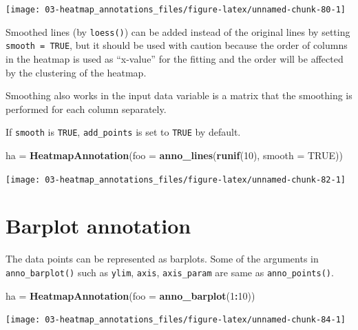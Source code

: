 \documentclass[]{book}
\newenvironment{Shaded}{\begin{snugshade}}{\end{snugshade}}
\newcommand{\KeywordTok}[1]{\textcolor[rgb]{0.13,0.29,0.53}{\textbf{#1}}}
\newcommand{\DataTypeTok}[1]{\textcolor[rgb]{0.13,0.29,0.53}{#1}}
\newcommand{\DecValTok}[1]{\textcolor[rgb]{0.00,0.00,0.81}{#1}}
\newcommand{\StringTok}[1]{\textcolor[rgb]{0.31,0.60,0.02}{#1}}
\newcommand{\OtherTok}[1]{\textcolor[rgb]{0.56,0.35,0.01}{#1}}
\newcommand{\OperatorTok}[1]{\textcolor[rgb]{0.81,0.36,0.00}{\textbf{#1}}}
\newcommand{\NormalTok}[1]{#1}
\theoremstyle{definition}
\theoremstyle{definition}
\theoremstyle{definition}
\theoremstyle{remark}
\begin{document}
\begin{center}\texttt{[image: 03-heatmap\_annotations\_files/figure-latex/unnamed-chunk-80-1]} \end{center}

Smoothed lines (by \texttt{loess()}) can be added instead of the
original lines by setting \texttt{smooth\ =\ TRUE}, but it should be
used with caution because the order of columns in the heatmap is used as
``x-value'' for the fitting and the order will be affected by the
clustering of the heatmap.

Smoothing also works in the input data variable is a matrix that the
smoothing is performed for each column separately.

If \texttt{smooth} is \texttt{TRUE}, \texttt{add\_points} is set to
\texttt{TRUE} by default.

\begin{Shaded}
\begin{Highlighting}[]
\NormalTok{ha =}\StringTok{ }\KeywordTok{HeatmapAnnotation}\NormalTok{(}\DataTypeTok{foo =} \KeywordTok{anno_lines}\NormalTok{(}\KeywordTok{runif}\NormalTok{(}\DecValTok{10}\NormalTok{), }\DataTypeTok{smooth =} \OtherTok{TRUE}\NormalTok{))}
\end{Highlighting}
\end{Shaded}

\begin{center}\texttt{[image: 03-heatmap\_annotations\_files/figure-latex/unnamed-chunk-82-1]} \end{center}

\section{Barplot annotation}\label{barplot_annotation}

The data points can be represented as barplots. Some of the arguments in
\texttt{anno\_barplot()} such as \texttt{ylim}, \texttt{axis},
\texttt{axis\_param} are same as \texttt{anno\_points()}.

\begin{Shaded}
\begin{Highlighting}[]
\NormalTok{ha =}\StringTok{ }\KeywordTok{HeatmapAnnotation}\NormalTok{(}\DataTypeTok{foo =} \KeywordTok{anno_barplot}\NormalTok{(}\DecValTok{1}\OperatorTok{:}\DecValTok{10}\NormalTok{))}
\end{Highlighting}
\end{Shaded}

\begin{center}\texttt{[image: 03-heatmap\_annotations\_files/figure-latex/unnamed-chunk-84-1]} \end{center}
\end{document}
